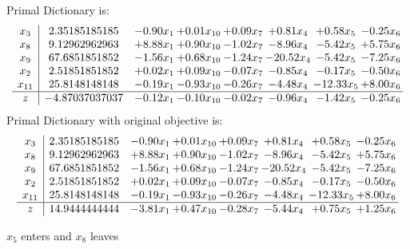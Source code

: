 \documentclass[8pt]{article}
\begin{document}
Primal Dictionary is:
\[\begin{array}{c| c c@{\hskip 2pt} c@{\hskip 2pt} c@{\hskip 2pt} c@{\hskip 2pt} c@{\hskip 2pt} c@{\hskip 2pt} }
 x_{3}   &  2.35185185185 & -0.90 x_{1} & +  0.01 x_{10} & +  0.09 x_{7} & +  0.81 x_{4} & +  0.58 x_{5} & -0.25 x_{6}\\
 x_{8}   &  9.12962962963 & +  8.88 x_{1} & +  0.90 x_{10} & -1.02 x_{7} & -8.96 x_{4} & -5.42 x_{5} & +  5.75 x_{6}\\
 x_{9}   &  67.6851851852 & -1.56 x_{1} & +  0.68 x_{10} & -1.24 x_{7} & -20.52 x_{4} & -5.42 x_{5} & -7.25 x_{6}\\
 x_{2}   &  2.51851851852 & +  0.02 x_{1} & +  0.09 x_{10} & -0.07 x_{7} & -0.85 x_{4} & -0.17 x_{5} & -0.50 x_{6}\\
 x_{11}   &  25.8148148148 & -0.19 x_{1} & -0.93 x_{10} & -0.26 x_{7} & -4.48 x_{4} & -12.33 x_{5} & +  8.00 x_{6}\\
\hline
z    &  -4.87037037037 & -0.12 x_{1} & -0.10 x_{10} & -0.02 x_{7} & -0.96 x_{4} & -1.42 x_{5} & -0.25 x_{6}\\
\end{array}\]
Primal Dictionary with original objective is:
\[\begin{array}{c| c c@{\hskip 2pt} c@{\hskip 2pt} c@{\hskip 2pt} c@{\hskip 2pt} c@{\hskip 2pt} c@{\hskip 2pt} }
 x_{3}   &  2.35185185185 & -0.90 x_{1} & +  0.01 x_{10} & +  0.09 x_{7} & +  0.81 x_{4} & +  0.58 x_{5} & -0.25 x_{6}\\
 x_{8}   &  9.12962962963 & +  8.88 x_{1} & +  0.90 x_{10} & -1.02 x_{7} & -8.96 x_{4} & -5.42 x_{5} & +  5.75 x_{6}\\
 x_{9}   &  67.6851851852 & -1.56 x_{1} & +  0.68 x_{10} & -1.24 x_{7} & -20.52 x_{4} & -5.42 x_{5} & -7.25 x_{6}\\
 x_{2}   &  2.51851851852 & +  0.02 x_{1} & +  0.09 x_{10} & -0.07 x_{7} & -0.85 x_{4} & -0.17 x_{5} & -0.50 x_{6}\\
 x_{11}   &  25.8148148148 & -0.19 x_{1} & -0.93 x_{10} & -0.26 x_{7} & -4.48 x_{4} & -12.33 x_{5} & +  8.00 x_{6}\\
\hline
z    &  14.9444444444 & -3.81 x_{1} & +  0.47 x_{10} & -0.28 x_{7} & -5.44 x_{4} & +  0.75 x_{5} & +  1.25 x_{6}\\
\end{array}\]


 $ x_{5} $ enters and $ x_{8} $ leaves 
\end{document}
